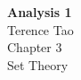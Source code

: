 \documentclass{article}
\begin{document}
    \begin{center}
        \vspace*{1cm}
        \Huge
        \textbf{Analysis 1} \\
        \vspace*{0.4cm}
        \huge
        Terence Tao \\
        \vspace*{1cm}
        \huge
        Chapter 3 \\
        \vspace*{0.25cm}
        Set Theory
    \end{center}
\end{document}
